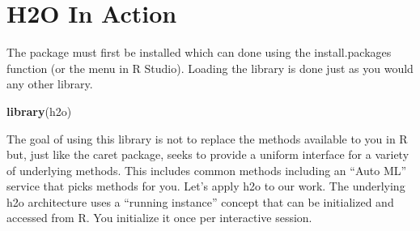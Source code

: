 \documentclass[
]{book}
\newenvironment{Shaded}{\begin{snugshade}}{\end{snugshade}}
\newcommand{\KeywordTok}[1]{\textcolor[rgb]{0.13,0.29,0.53}{\textbf{#1}}}
\newcommand{\NormalTok}[1]{#1}
\begin{document}
\hypertarget{h2o-in-action}{%
\section{H2O In Action}\label{h2o-in-action}}

The package must first be installed which can done using the install.packages function (or the menu in R Studio). Loading the library is done just as you would any other library.

\begin{Shaded}
\begin{Highlighting}[]
\KeywordTok{library}\NormalTok{(h2o)}
\end{Highlighting}
\end{Shaded}

The goal of using this library is not to replace the methods available to you in R but, just like the caret package, seeks to provide a uniform interface for a variety of underlying methods. This includes common methods including an ``Auto ML'' service that picks methods for you. Let's apply h2o to our work. The underlying h2o architecture uses a ``running instance'' concept that can be initialized and accessed from R. You initialize it once per interactive session.
\end{document}
